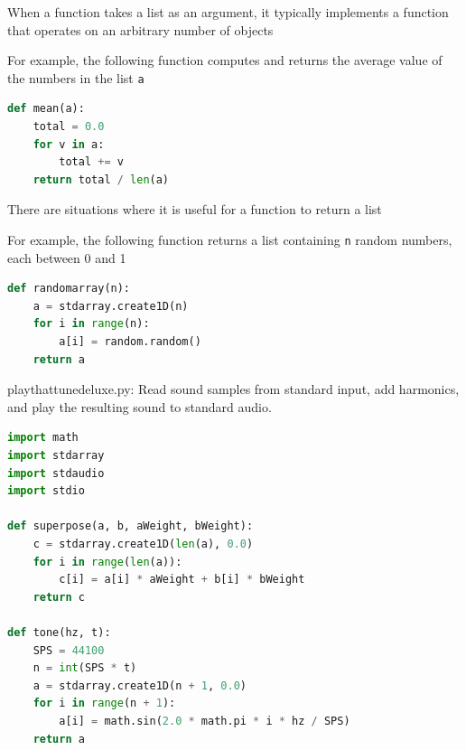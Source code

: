 \documentclass[8pt,a4paper,compress]{beamer}
\begin{document}
\begin{frame}[fragile]
\pause

When a function takes a list as an argument, it typically implements a function that operates on an arbitrary number of objects

\pause
\bigskip

For example, the following function computes and returns the average value of the numbers in the list \lstinline{a}

\smallskip

\begin{lstlisting}[language=Python,style=focusin]
def mean(a):
    total = 0.0
    for v in a:
        total += v
    return total / len(a)
\end{lstlisting}

\pause
\bigskip

There are situations where it is useful for a function to return a list

\pause
\bigskip

For example, the following function returns a list containing \lstinline{n} random numbers, each between 0 and 1

\smallskip

\begin{lstlisting}[language=Python,style=focusin]
def randomarray(n):
    a = stdarray.create1D(n)
    for i in range(n):
        a[i] = random.random()
    return a
\end{lstlisting}
\end{frame}

\begin{frame}[fragile]
\pause

\begin{framed}
\tiny playthattunedeluxe.py: Read sound samples from standard input, add harmonics, and play the resulting sound to standard audio.
\end{framed}

\begin{lstlisting}[language=Python,style=focusin]
import math
import stdarray
import stdaudio
import stdio

def superpose(a, b, aWeight, bWeight):
    c = stdarray.create1D(len(a), 0.0)
    for i in range(len(a)):
        c[i] = a[i] * aWeight + b[i] * bWeight
    return c

def tone(hz, t):
    SPS = 44100
    n = int(SPS * t)
    a = stdarray.create1D(n + 1, 0.0)
    for i in range(n + 1):
        a[i] = math.sin(2.0 * math.pi * i * hz / SPS)
    return a

\end{lstlisting}
\end{frame}
\end{document}
